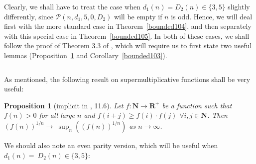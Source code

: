 \documentclass{article}
\newtheorem{Proposition}[Theorem]{Proposition}
\newtheorem{Proof of Theorem}{Proof of Theorem}
\begin{document}
Clearly, we shall have to treat the case when $d_{1}(n)=D_{2}(n) \in \{ 3,5 \}$
slightly differently,
since $\mathcal{P}(n,d_{1},5,0,D_{2})$ will be empty if $n$ is odd.
Hence, we will deal first with the more standard case in Theorem~\ref{bounded104},
and then separately with this special case in Theorem~\ref{bounded105}.
In both of these cases,
we shall follow the proof of Theorem 3.3 of \cite{mcd},
which will require us to first state two useful lemmas (Proposition~\ref{vanL 11.6} and Corollary~\ref{bounded103}). 





\begin{figure}[omitted: a diagram of this paper's results, not reproduced here]\end{figure}









\begin{displaymath}
\end{displaymath}

As mentioned, the following result on supermultiplicative functions shall be very useful:















\begin{Proposition}[implicit in \cite{vanL}, 11.6] \label{vanL 11.6}
Let $f:\mathbf{N} \to \mathbf{R}^{+}$ be a function such that
$f(n)>0$ for all large $n$ and
$f(i+j) \geq f(i) \cdot f(j)$ $\forall i,j \in \mathbf{N}$.
Then $(f(n))^{1/n} \to~\sup_{n} \left( (f(n))^{1/n} \right)$ as $n \to \infty$. \\
\end{Proposition} 















We should also note an even parity version,
which will be useful when $d_{1}(n)=~D_{2}(n) \in \{ 3,5 \}$:
\end{document}
